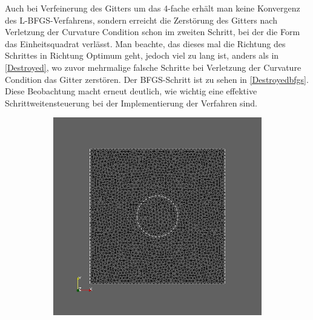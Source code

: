 Auch bei Verfeinerung des Gitters um das 4-fache erhält man keine Konvergenz des L-BFGS-Verfahrens, sondern erreicht die Zerstörung des Gitters nach Verletzung der Curvature Condition schon im zweiten Schritt, bei der die Form das Einheitsquadrat verlässt. Man beachte, das dieses mal die Richtung des Schrittes in Richtung Optimum geht, jedoch viel zu lang ist, anders als in \ref{Destroyed}, wo zuvor mehrmalige falsche Schritte bei Verletzung der Curvature Condition das Gitter zerstören. Der BFGS-Schritt ist zu sehen in \ref{Destroyedbfgs}. Diese Beobachtung macht erneut deutlich, wie wichtig eine effektive Schrittweitensteuerung bei der Implementierung der Verfahren sind.

\begin{figure}
	\begin{subfigure}{0.5\textwidth}
	\centering
	\includegraphics[scale=0.25]{pic_smallcircle_bfgsdestroyed1.jpg}
	\caption{}	
	\end{subfigure}
	\begin{subfigure}{0.5\textwidth}
	\centering

\end{subfigure}
\end{figure}
